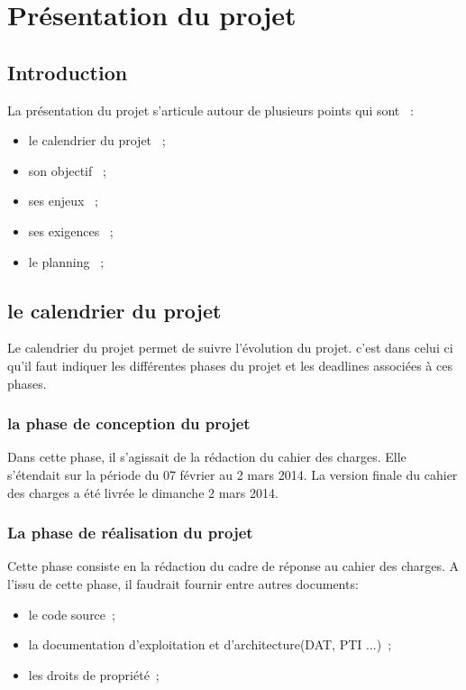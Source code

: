 \chapter{Présentation du projet}

% 

\section{Introduction}
La présentation du projet s'articule autour de plusieurs points qui sont ~: 
\begin{itemize}
   \item le calendrier du projet ~;
   \item son objectif ~;
   \item ses enjeux ~;
   \item ses exigences ~;
   \item le planning ~;
\end{itemize}

\section{le calendrier du projet}
Le calendrier du projet permet de suivre l'évolution du projet. c'est dans celui ci qu'il faut indiquer les différentes phases du projet et les deadlines associées à ces phases.

\subsection{la phase de conception du projet}
Dans cette phase, il s'agissait de la rédaction du cahier des charges. Elle s'étendait sur la période du 07 février au 2 mars 2014. La version finale du cahier des charges a été livrée le dimanche 2 mars 2014. 

\subsection{La phase de réalisation du projet}
Cette phase consiste en la rédaction du cadre de réponse au cahier des charges. A l'issu de cette phase, il faudrait fournir entre autres documents:
  \begin{itemize}
    \item le code source~;
    \item la documentation d'exploitation et d'architecture(DAT, PTI ...)~;
    \item les droits de propriété~;
  \end{itemize}

